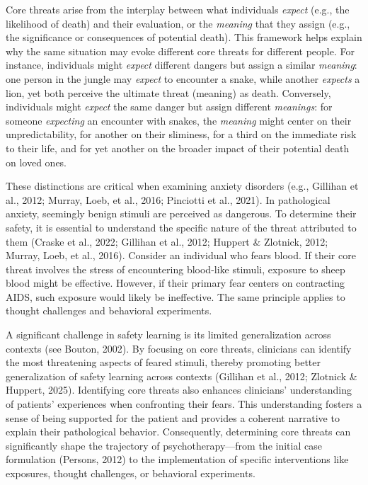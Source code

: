 \documentclass[
  man,floatsintext]{apa7}
\begin{document}
Core threats arise from the interplay between what individuals \emph{expect} (e.g., the likelihood of death) and their evaluation, or the \emph{meaning} that they assign (e.g., the significance or consequences of potential death).
This framework helps explain why the same situation may evoke different core threats for different people.
For instance, individuals might \emph{expect} different dangers but assign a similar \emph{meaning}:
one person in the jungle may \emph{expect} to encounter a snake, while another \emph{expects} a lion, yet both perceive the ultimate threat (meaning) as death.
Conversely, individuals might \emph{expect} the same danger but assign different \emph{meanings}:
for someone \emph{expecting} an encounter with snakes, the \emph{meaning} might center on their unpredictability, for another on their sliminess, for a third on the immediate risk to their life, and for yet another on the broader impact of their potential death on loved ones.

These distinctions are critical when examining anxiety disorders (e.g., Gillihan et al., 2012; Murray, Loeb, et al., 2016; Pinciotti et al., 2021).
In pathological anxiety, seemingly benign stimuli are perceived as dangerous.
To determine their safety, it is essential to understand the specific nature of the threat attributed to them (Craske et al., 2022; Gillihan et al., 2012; Huppert \& Zlotnick, 2012; Murray, Loeb, et al., 2016).
Consider an individual who fears blood.
If their core threat involves the stress of encountering blood-like stimuli, exposure to sheep blood might be effective.
However, if their primary fear centers on contracting AIDS, such exposure would likely be ineffective.
The same principle applies to thought challenges and behavioral experiments.

A significant challenge in safety learning is its limited generalization across contexts (see Bouton, 2002).
By focusing on core threats, clinicians can identify the most threatening aspects of feared stimuli, thereby promoting better generalization of safety learning across contexts (Gillihan et al., 2012; Zlotnick \& Huppert, 2025).
Identifying core threats also enhances clinicians' understanding of patients' experiences when confronting their fears.
This understanding fosters a sense of being supported for the patient and provides a coherent narrative to explain their pathological behavior.
Consequently, determining core threats can significantly shape the trajectory of psychotherapy---from the initial case formulation (Persons, 2012) to the implementation of specific interventions like exposures, thought challenges, or behavioral experiments.
\end{document}
